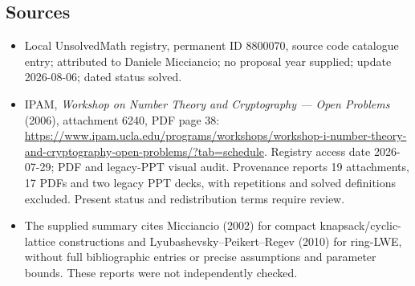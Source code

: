\documentclass[11pt]{article}
\begin{document}
\subsection{Sources}
\begin{itemize}
\item Local UnsolvedMath registry, permanent ID 8800070, source code catalogue entry; attributed to Daniele Micciancio; no proposal year supplied; update 2026-08-06; dated status solved.
\item IPAM, \emph{Workshop on Number Theory and Cryptography --- Open Problems} (2006), attachment 6240, PDF page 38: \url{https://www.ipam.ucla.edu/programs/workshops/workshop-i-number-theory-and-cryptography-open-problems/?tab=schedule}. Registry access date 2026-07-29; PDF and legacy-PPT visual audit. Provenance reports 19 attachments, 17 PDFs and two legacy PPT decks, with repetitions and solved definitions excluded. Present status and redistribution terms require review.
\item The supplied summary cites Micciancio (2002) for compact knapsack/cyclic-lattice constructions and Lyubashevsky--Peikert--Regev (2010) for ring-LWE, without full bibliographic entries or precise assumptions and parameter bounds. These reports were not independently checked.
\end{itemize}
\end{document}
